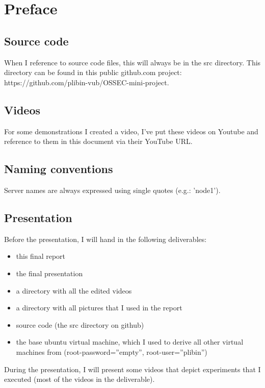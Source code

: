 \documentclass[12pt]{report}
\begin{document}

\tableofcontents %

\newpage %

\chapter*{Preface}
\section{Source code}
When I reference to source code files, this will always be in the src
directory. This directory can be found in this public github.com
project: https://github.com/plibin-vub/OSSEC-mini-project.
\section{Videos}
For some demonstrations I created a video, I've put these videos on
Youtube and reference to them in this document via their YouTube URL.
\section{Naming conventions}
Server names are always expressed using single quotes (e.g.: 'node1').
\section{Presentation}
Before the presentation, I will hand in the following deliverables:
\begin{itemize}
\item this final report
\item the final presentation
\item a directory with all the edited videos
\item a directory with all pictures that I used in the report
\item source code (the src directory on github)
\item the base ubuntu virtual machine, which I used to derive all
  other virtual machines from (root-password=''empty'', root-user=''plibin'')
\end{itemize}
During the presentation, I will present some videos that depict
experiments that I executed (most of the videos in the deliverable).
\end{document}
